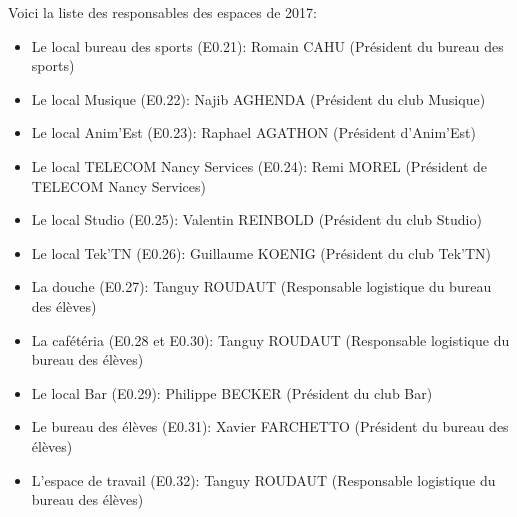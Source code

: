 \documentclass{article} %
\begin{document}
		Voici la liste des responsables des espaces de 2017:
		\begin{itemize}
			\item Le local bureau des sports (E0.21): Romain CAHU (Président
				du bureau des sports)
			\item Le local Musique (E0.22): Najib AGHENDA (Président du club
				Musique)
			\item Le local Anim’Est (E0.23): Raphael AGATHON (Président
				d’Anim’Est)
			\item Le local TELECOM Nancy Services (E0.24): Remi MOREL (Président
				de TELECOM Nancy Services)
			\item Le local Studio (E0.25): Valentin REINBOLD (Président du club
				Studio)
			\item Le local Tek’TN (E0.26): Guillaume KOENIG (Président du club
				Tek’TN)
			\item La douche (E0.27): Tanguy ROUDAUT (Responsable logistique du
				bureau des élèves)
			\item La cafétéria (E0.28 et E0.30): Tanguy ROUDAUT (Responsable
				logistique du bureau des élèves)
			\item Le local Bar (E0.29): Philippe BECKER (Président du club Bar)
			\item Le bureau des élèves (E0.31): Xavier FARCHETTO (Président du
				bureau des élèves)
			\item L’espace de travail (E0.32): Tanguy ROUDAUT (Responsable
				logistique du bureau des élèves)
		\end{itemize}
\end{document}
